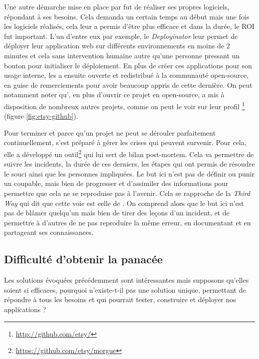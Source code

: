 Une autre démarche mise en place par \etsy{} fut de réaliser ses propres logiciels, répondant à ses besoins. Cela demanda un certain temps au début mais une fois les logiciels réalisés, cela leur a permis d'être plus efficace et dans la durée, le \gls{ROI} fut important. L'un d'entre eux par exemple, le \emph{Deployinator} leur permet de déployer leur application web sur différents environnements en moins de 2 minutes et cela sans intervention humaine autre qu'une personne pressant un bouton pour initialiser le déploiement. En plus de créer ces applications pour son usage interne, \etsy{} les a ensuite ouverte et redistribué à la communauté open-source, en guise de remerciements pour avoir beaucoup appris de cette dernière. On peut notamment noter qu'\etsy, en plus d'ouvrir ce projet en open-source, a mis à disposition de nombreux autres projets, comme on peut le voir sur leur profil \github\footnote{ \url{http://github.com/etsy/}} (figure \ref{fig:etsy-github}).


Pour terminer et parce qu'un projet ne peut se dérouler parfaitement continuellement, \etsy{} s'est préparé à gérer les crises qui peuvent survenir. Pour cela, elle a développé un outil\footnote{\url{https://github.com/etsy/morgue}} qui lui sert de bilan post-mortem\label{post-mortem}. Cela va permettre de suivre les incidents, la durée de ces derniers, les étapes qui ont permis de résoudre le souci ainsi que les personnes impliquées. Le but ici n'est pas de définir ou punir un coupable, mais bien de progresser et d'assimiler des informations pour permettre que cela ne se reproduise pas à l'avenir. Cela se rapproche de la \emph{Third Way} qui dit que cette voie est celle de . On comprend alors que le but ici n'est pas de blâmer quelqu'un mais bien de tirer des leçons d'un incident, et de permettre à d'autres de ne pas reproduire la même erreur, en documentant et en partageant ses connaissances.

\subsection{Difficulté d'obtenir la panacée}

Les solutions évoquées précédemment sont intéressantes mais supposons qu'elles soient si efficaces, pourquoi n'existe-t-il pas une solution unique, permettant de répondre à tous les besoins et qui pourrait tester, construire et déployer nos applications ?

